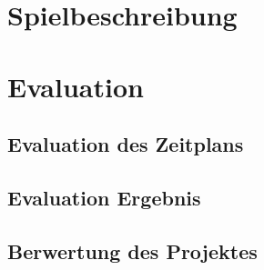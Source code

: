\documentclass[10pt,a4paper,notitlepage]{report}
\begin{document}
	\clearpage

	\chapter{Spielbeschreibung}

	\chapter{Evaluation}
	\section{Evaluation des Zeitplans}

	\section{Evaluation Ergebnis}

	\section{Berwertung des Projektes}
\end{document}
